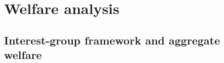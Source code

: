 \section{Welfare analysis}
\label{sec:welfare}
\label{sec:policy:welfare}

\subsection{Interest-group framework and aggregate welfare}
\label{sec:welfare:object}

